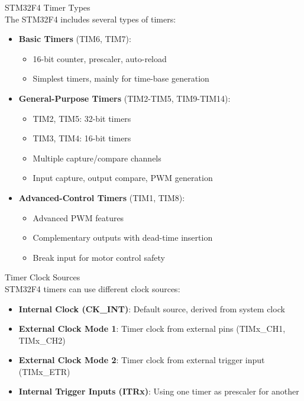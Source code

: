 \begin{concept}{STM32F4 Timer Types}\\
The STM32F4 includes several types of timers:
\begin{itemize}
    \item \textbf{Basic Timers} (TIM6, TIM7):
    \begin{itemize}
        \item 16-bit counter, prescaler, auto-reload
        \item Simplest timers, mainly for time-base generation
    \end{itemize}
    \item \textbf{General-Purpose Timers} (TIM2-TIM5, TIM9-TIM14):
    \begin{itemize}
        \item TIM2, TIM5: 32-bit timers
        \item TIM3, TIM4: 16-bit timers
        \item Multiple capture/compare channels
        \item Input capture, output compare, PWM generation
    \end{itemize}
    \item \textbf{Advanced-Control Timers} (TIM1, TIM8):
    \begin{itemize}
        \item Advanced PWM features
        \item Complementary outputs with dead-time insertion
        \item Break input for motor control safety
    \end{itemize}
\end{itemize}
\end{concept}

\begin{definition}{Timer Clock Sources}\\
STM32F4 timers can use different clock sources:
\begin{itemize}
    \item \textbf{Internal Clock (CK\_INT)}: Default source, derived from system clock
    \item \textbf{External Clock Mode 1}: Timer clock from external pins (TIMx\_CH1, TIMx\_CH2)
    \item \textbf{External Clock Mode 2}: Timer clock from external trigger input (TIMx\_ETR)
    \item \textbf{Internal Trigger Inputs (ITRx)}: Using one timer as prescaler for another
\end{itemize}
\end{definition}




